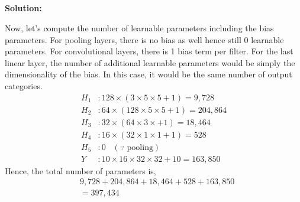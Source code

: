 \documentclass{article}
\newenvironment{solution}
  {\par\noindent\textbf{Solution:}\par}
  {\par}
\begin{document}
\subsection{}
\begin{solution}
  Now, let's compute the number of learnable parameters including the bias parameters. For pooling layers, there is no bias as well hence still 0 learnable parameters. For convolutional layers,
  there is 1 bias term per filter. For the last linear layer, the number of additional learnable parameters would be simply the dimensionality of the bias. In this case, it would be the same number of output categories.
\[
    \begin{aligned}
    H_1 &: 128 \times (3 \times 5 \times 5 + 1) =9,728\\ 
    H_2 &:  64 \times (128 \times 5 \times 5 + 1) = 204,864 \\  
    H_3 &: 32 \times (64 \times 3 \times+ 1) = 18,464 \\ 
    H_4 &: 16 \times (32 \times 1  \times 1 +1) = 528 \\ 
    H_5 &: 0 \;\;\; \left( \because \text{ pooling} \right) \\  
    Y &: 10 \times 16 \times 32 \times 32 +  10 = 163,850 
  \end{aligned}
  \]
Hence, the total number of parameters is,
\[
\begin{aligned}
  &9,728+204,864+ 18,464 + 528 + 163,850 \\ 
  &= 397,434
\end{aligned}
\]
\end{solution}
\end{document}
